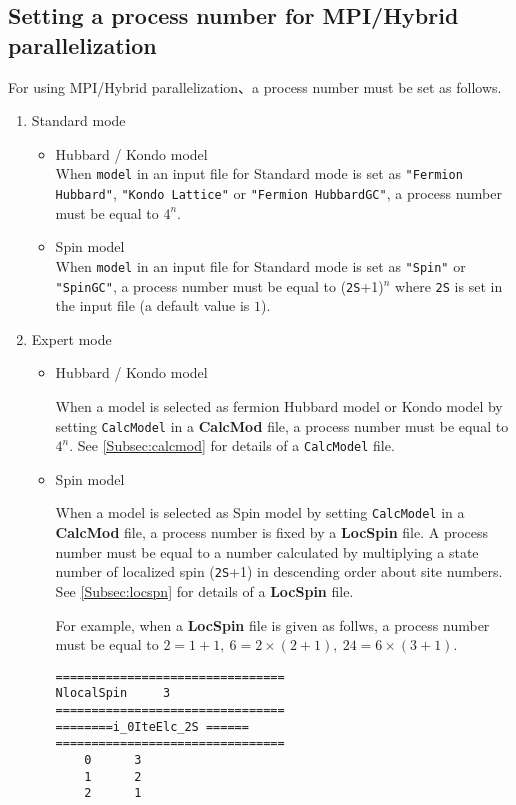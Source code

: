 \newpage
\subsection{Setting a process number for MPI/Hybrid parallelization}
\label{subsec:process}
{For using MPI/Hybrid parallelization、a process number must be set as follows.}
\begin{enumerate}
\item{Standard mode}

\begin{itemize}
\item{Hubbard / Kondo model}\\
When \verb|model| in an input file for Standard mode is set as \verb|"Fermion Hubbard"|, \verb|"Kondo Lattice"| or \verb|"Fermion HubbardGC"|,  a process number must be equal to $4^n$.

\item{Spin model}\\
When \verb|model| in an input file for Standard mode is set as \verb|"Spin"| or \verb|"SpinGC"|,  a process number must be equal to (\verb|2S|+1)${}^n$ where \verb|2S| is set in the input file (a default value is $1$).

\end{itemize}
\item{Expert mode}

\begin{itemize}
\item{Hubbard / Kondo model}

When a model is selected as fermion Hubbard model or Kondo model by setting \verb|CalcModel| in a {\bf CalcMod} file, a process number must be equal to $4^n$.
See \ref{Subsec:calcmod} for details of a \verb|CalcModel| file.

\item{Spin model}

When a model is selected as Spin model by setting \verb|CalcModel| in a {\bf CalcMod} file, a process number is fixed by a {\bf LocSpin} file. A process number must be equal to a number calculated by multiplying a state number of localized spin (\verb|2S|+1) in descending order about site numbers.
See \ref{Subsec:locspn} for details of a {\bf LocSpin} file.

For example, when a {\bf LocSpin} file is given as follws, a process number must be equal to $2=1+1,~6=2\times(2+1),~24=6\times(3+1)$.
\begin{minipage}{10cm}
\begin{screen}
\begin{verbatim}
================================ 
NlocalSpin     3
================================ 
========i_0IteElc_2S ====== 
================================ 
    0      3
    1      2
    2      1
\end{verbatim}
\end{screen}
\end{minipage}

\end{itemize}

\end{enumerate}

